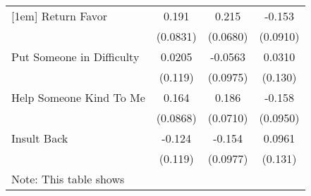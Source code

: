 {\begin{tabular}{l*{3}{c}}
[1em]
Return Favor&       0.191\sym{*}  &       0.215\sym{**} &      -0.153         \\
            &    (0.0831)         &    (0.0680)         &    (0.0910)         \\
[1em]
Put Someone in Difficulty&      0.0205         &     -0.0563         &      0.0310         \\
            &     (0.119)         &    (0.0975)         &     (0.130)         \\
[1em]
Help Someone Kind To Me&       0.164         &       0.186\sym{**} &      -0.158         \\
            &    (0.0868)         &    (0.0710)         &    (0.0950)         \\
[1em]
Insult Back &      -0.124         &      -0.154         &      0.0961         \\
            &     (0.119)         &    (0.0977)         &     (0.131)         \\
\hline\hline
\multicolumn{4}{l}{\footnotesize Note: This table shows}\\
\end{tabular}
}
